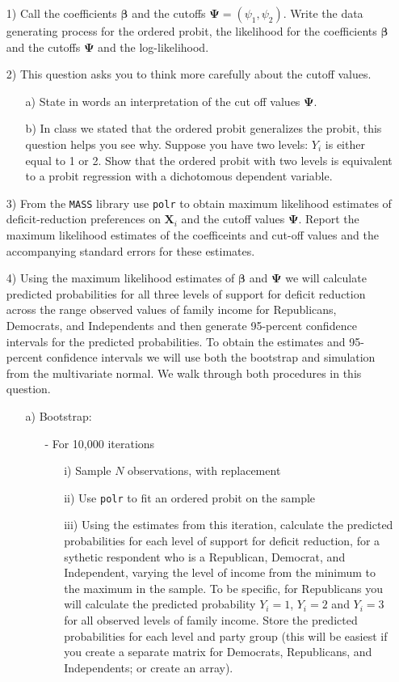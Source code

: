 \documentclass[letterpaper,12pt]{article}
\numberwithin{equation}{section}
\numberwithin{equation}{section}
\begin{document}
\begin{itemize}
\item[1)] Call the coefficients $\boldsymbol{\beta}$ and the cutoffs $\boldsymbol{\Psi} = (\psi_{1}, \psi_{2})$. Write the data generating process for the ordered probit, the likelihood for the coefficients $\boldsymbol{\beta}$ and the cutoffs $\boldsymbol{\Psi}$ and the log-likelihood.
\item[2)] This question asks you to think more carefully about the cutoff values.
\begin{itemize}
\item[a)] State in words an interpretation of the cut off values $\boldsymbol{\Psi}$.
\item[b)] In class we stated that the ordered probit generalizes the probit, this question helps you see why. Suppose you have two levels: $Y_{i} $ is either equal to 1 or 2.  Show that the ordered probit with two levels is equivalent to a probit regression with a dichotomous dependent variable.
\end{itemize}
\item[3)] From the {\tt MASS} library use {\tt polr} to obtain maximum likelihood estimates of  deficit-reduction preferences on $\boldsymbol{X}_{i} $ and the cutoff values $\boldsymbol{\Psi}$.  Report the maximum likelihood estimates of the coefficeints and cut-off values and the accompanying standard errors for these estimates.
\item[4)] Using the maximum likelihood estimates of $\boldsymbol{\beta}$ and $\boldsymbol{\Psi}$ we will calculate predicted probabilities for all three levels of support for deficit reduction across the range observed values of family income for Republicans, Democrats, and Independents and then generate 95-percent confidence intervals for the predicted probabilities. To obtain the estimates and 95-percent confidence intervals we will use both the bootstrap and simulation from the multivariate normal.  We walk through both procedures in this question.
\begin{itemize}
\item[a)] Bootstrap:
\begin{itemize}
\item[-] For 10,000 iterations
\begin{itemize}
\item[i)] Sample $N$ observations, with replacement
\item[ii)] Use {\tt polr} to fit an ordered probit on the sample
\item[iii)] Using the estimates from this iteration, calculate the predicted probabilities for each level of support for deficit reduction, for a sythetic respondent who is a Republican, Democrat, and Independent, varying the level of income from the minimum to the maximum in the sample.   To be specific, for Republicans you will calculate the predicted probability $Y_{i} = 1$, $Y_{i} = 2$ and $Y_{i} = 3$ for all observed levels of family income.  Store the predicted probabilities for each level and party group (this will be easiest if you create a separate matrix for Democrats, Republicans, and Independents; or create an array).

\end{itemize}
\end{itemize}
\end{itemize}
\end{itemize}
\end{document}
